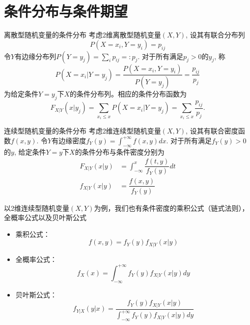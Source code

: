 \section{条件分布与条件期望}


\begin{frame}

\begin{block}{离散型随机变量的条件分布}
考虑2维离散型随机变量$(X,Y)$, 设其有联合分布列
$$P(X=x_i, Y = y_i) = p_{ij}$$
令$Y$有边缘分布列$P(Y = y_j) = \sum\limits_{i} p_{ij} =: p_j$. 对于所有满足$p_j > 0$的$y_j$, 称
$$P(X = x_i | Y = y_j) = \dfrac{P(X=x_i, Y = y_i)}{P(Y = y_j)} = \dfrac{p_{ij}}{p_j}$$
为给定条件$Y=y_j$下$X$的条件分布列。相应的条件分布函数为
$$F_{X|Y}(x|y_j) = \sum\limits_{x_i \le x} P(X = x_i | Y = y_j) = \sum\limits_{x_i \le x} \dfrac{p_{ij}}{p_j}.$$
\end{block}

\end{frame}


\begin{frame}

\begin{block}{连续型随机变量的条件分布}
考虑2维连续型随机变量$(X,Y)$, 设其有联合密度函数$f(x,y)$. 令$Y$有边缘密度$f_Y(y) = \int_{-\infty}^{+\infty} f(x,y)dx$. 对于所有满足$f_Y(y) > 0$的$y$, 给定条件$Y=y$下$X$的条件分布与条件密度分别为
\begin{align*}
F_{X|Y}(x|y) & = \int_{-\infty}^x \dfrac{f(t,y)}{f_Y(y)} dt \\
f_{X|Y}(x|y) & = \dfrac{f(x,y)}{f_Y(y)}
\end{align*}
\end{block}

\end{frame}


\begin{frame}

以2维连续型随机变量$(X,Y)$为例，我们也有条件密度的乘积公式（链式法则），全概率公式以及贝叶斯公式
\begin{itemize}
\item 乘积公式：
$$f(x,y) = f_Y(y) f_{X|Y}(x|y)$$
\item 全概率公式：
$$f_X(x) = \int^{+\infty}_{-\infty} f_Y(y) f_{X|Y}(x|y) dy$$
\item 贝叶斯公式：
$$f_{Y|X}(y|x) = \dfrac{f_Y(y)f_{X|Y}(x|y)}{\int^{+\infty}_{-\infty} f_Y(y) f_{X|Y}(x|y) dy}$$
\end{itemize}

\end{frame}

